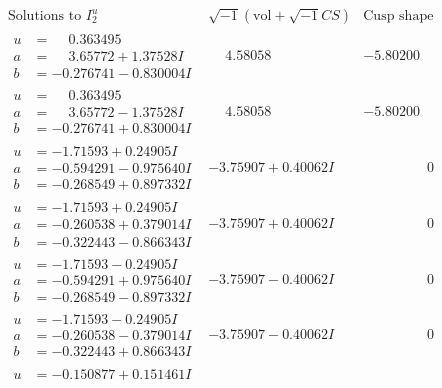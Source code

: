 \documentclass[1p]{elsarticle_modified}
\theoremstyle{definition}
\newcommand{\I}{\sqrt{-1}}
\begin{document}
$$\begin{array}{c|c|c}
\text{Solutions to }I^u_{2}& \I (\text{vol} + \sqrt{-1}CS) & \text{Cusp shape}\\
 \hline 
\begin{aligned}
u &= \phantom{-}0.363495\phantom{ +0.000000I} \\
a &= \phantom{-}3.65772 + 1.37528 I \\
b &= -0.276741 - 0.830004 I\end{aligned}
 & \phantom{-}4.58058\phantom{ +0.000000I} & -5.80200\phantom{ +0.000000I} \\ \hline\begin{aligned}
u &= \phantom{-}0.363495\phantom{ +0.000000I} \\
a &= \phantom{-}3.65772 - 1.37528 I \\
b &= -0.276741 + 0.830004 I\end{aligned}
 & \phantom{-}4.58058\phantom{ +0.000000I} & -5.80200\phantom{ +0.000000I} \\ \hline\begin{aligned}
u &= -1.71593 + 0.24905 I \\
a &= -0.594291 - 0.975640 I \\
b &= -0.268549 + 0.897332 I\end{aligned}
 & -3.75907 + 0.40062 I & \phantom{-0.000000 } 0 \\ \hline\begin{aligned}
u &= -1.71593 + 0.24905 I \\
a &= -0.260538 + 0.379014 I \\
b &= -0.322443 - 0.866343 I\end{aligned}
 & -3.75907 + 0.40062 I & \phantom{-0.000000 } 0 \\ \hline\begin{aligned}
u &= -1.71593 - 0.24905 I \\
a &= -0.594291 + 0.975640 I \\
b &= -0.268549 - 0.897332 I\end{aligned}
 & -3.75907 - 0.40062 I & \phantom{-0.000000 } 0 \\ \hline\begin{aligned}
u &= -1.71593 - 0.24905 I \\
a &= -0.260538 - 0.379014 I \\
b &= -0.322443 + 0.866343 I\end{aligned}
 & -3.75907 - 0.40062 I & \phantom{-0.000000 } 0 \\ \hline\begin{aligned}
u &= -0.150877 + 0.151461 I \\

\end{aligned}
\end{array}$$
\end{document}
